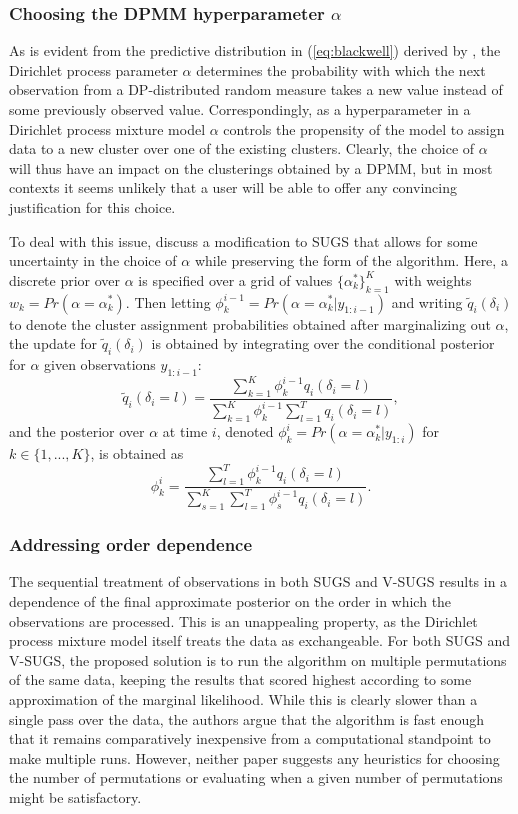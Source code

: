 \documentclass{uwstat572}
\begin{document}
\subsubsection{Choosing the DPMM hyperparameter $\alpha$}

As is evident from the predictive distribution in (\ref{eq:blackwell}) derived by \cite{blackwell}, the Dirichlet process parameter $\alpha$ determines the probability with which the next observation from a DP-distributed random measure takes a new value instead of some previously observed value. Correspondingly, as a hyperparameter in a Dirichlet process mixture model $\alpha$ controls the propensity of the model to assign data to a new cluster over one of the existing clusters. Clearly, the choice of $\alpha$ will thus have an impact on the clusterings obtained by a DPMM, but in most contexts it seems unlikely that a user will be able to offer any convincing justification for this choice. 

To deal with this issue, \cite{wang} discuss a modification to SUGS that allows for some uncertainty in the choice of $\alpha$ while preserving the form of the algorithm. Here, a discrete prior over $\alpha$ is specified over a grid of values $\{\alpha^*_k\}_{k=1}^K$ with weights $w_k = Pr(\alpha = \alpha_k^*)$. Then letting $\phi_k^{i-1} = Pr(\alpha = \alpha_k^* | y_{1:i-1})$ and writing $\tilde{q}_i(\delta_i)$ to denote the cluster assignment probabilities obtained after marginalizing out $\alpha$, the update for $\tilde{q}_i(\delta_i)$ is obtained by integrating over the conditional posterior for $\alpha$ given observations $y_{1:i-1}$:
$$ \tilde{q}_i(\delta_i = l) = \frac{\sum_{k=1}^K \phi_k^{i-1} q_i(\delta_i = l)}{\sum_{k=1}^K \phi_k^{i-1} \sum_{l=1}^T q_i(\delta_i = l)}, $$
and the posterior over $\alpha$ at time $i$, denoted $\phi_k^{i} = Pr(\alpha = \alpha_k^* | y_{1:i})$ for $k \in \{1,...,K\}$, is obtained as 
$$ \phi_k^{i} = \frac{\sum_{l=1}^T \phi_k^{i-1} q_i(\delta_i = l)}{\sum_{s=1}^K \sum_{l=1}^T \phi_s^{i-1} q_i(\delta_i = l)}.$$

\subsubsection{Addressing order dependence}

The sequential treatment of observations in both SUGS and V-SUGS results in a dependence of the final approximate posterior on the order in which the observations are processed. This is an unappealing property, as the Dirichlet process mixture model itself treats the data as exchangeable. For both SUGS and V-SUGS, the proposed solution is to run the algorithm on multiple permutations of the same data, keeping the results that scored highest according to some approximation of the marginal likelihood. While this is clearly slower than a single pass over the data, the authors argue that the algorithm is fast enough that it remains comparatively inexpensive from a computational standpoint to make multiple runs. However, neither paper suggests any heuristics for choosing the number of permutations or evaluating when a given number of permutations might be satisfactory.
\end{document}

